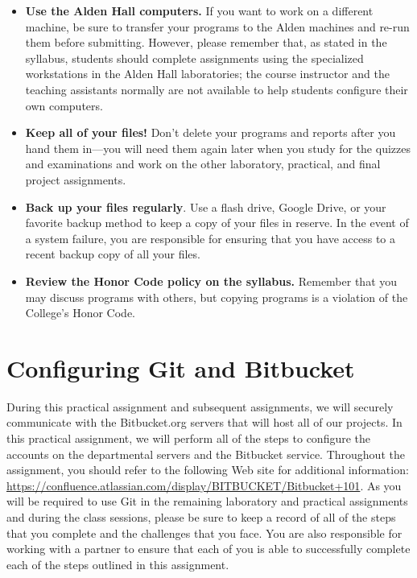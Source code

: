 \begin{itemize}
  \setlength{\itemsep}{0pt}

  \item {\bf Use the Alden Hall computers.} If you want to work on a different machine, be sure to transfer your
    programs to the Alden machines and re-run them before submitting. However, please remember that, as stated in the
    syllabus, students should complete assignments using the specialized workstations in the Alden Hall laboratories;
    the course instructor and the teaching assistants normally are not available to help students configure their own
    computers.

  \item {\bf Keep all of your files!} Don't delete your programs and reports after you hand them in---you will need
    them again later when you study for the quizzes and examinations and work on the other laboratory, practical, and
    final project assignments.

  \item {\bf Back up your files regularly}. Use a flash drive, Google Drive, or your favorite backup method to keep a
    copy of your files in reserve. In the event of a system failure, you are responsible for ensuring that you have
    access to a recent backup copy of all your files.

  \item {\bf Review the Honor Code policy on the syllabus.} Remember that you may discuss programs with others, but
    copying programs is a violation of the College's Honor Code.

\end{itemize}


\section*{Configuring Git and Bitbucket}

During this practical assignment and subsequent assignments, we will securely communicate with the Bitbucket.org
servers that will host all of our projects.  In this practical assignment, we will perform all of the steps to configure
the accounts on the departmental servers and the Bitbucket service.  Throughout the assignment, you should refer to the
following Web site for additional information: \url{https://confluence.atlassian.com/display/BITBUCKET/Bitbucket+101}.
As you will be required to use Git in the remaining laboratory and practical assignments and during the class sessions,
please be sure to keep a record of all of the steps that you complete and the challenges that you face.  You are also
responsible for working with a partner to ensure that each of you is able to successfully complete each of the steps
outlined in this assignment.

